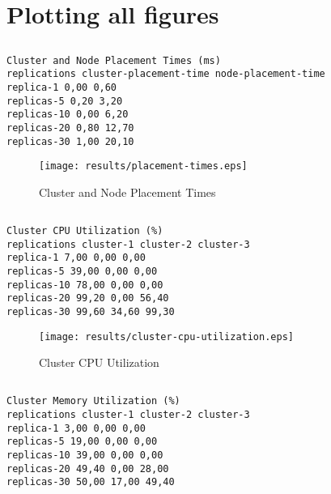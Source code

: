 \documentclass{elsart}
\begin{document}
\section{Plotting all figures}
\subsection{}

\begin{lstlisting}[caption={Cluster and Node Placement Times}]
Cluster and Node Placement Times (ms)
replications cluster-placement-time node-placement-time
replica-1 0,00 0,60
replicas-5 0,20 3,20
replicas-10 0,00 6,20
replicas-20 0,80 12,70
replicas-30 1,00 20,10
\end{lstlisting}

\begin{figure}[ht]
\centering
\texttt{[image: results/placement-times.eps]}
\caption{Cluster and Node Placement Times}\label{fig:placement-times.eps}
\end{figure}

\subsection{}

\begin{lstlisting}[caption={Cluster CPU Utilization}]
Cluster CPU Utilization (%)
replications cluster-1 cluster-2 cluster-3
replica-1 7,00 0,00 0,00
replicas-5 39,00 0,00 0,00
replicas-10 78,00 0,00 0,00
replicas-20 99,20 0,00 56,40
replicas-30 99,60 34,60 99,30
\end{lstlisting}

\begin{figure}[ht]
\centering
\texttt{[image: results/cluster-cpu-utilization.eps]}
\caption{Cluster CPU Utilization}\label{fig:cluster-cpu-utilization.eps}
\end{figure}

\subsection{}

\begin{lstlisting}[caption={Cluster Memory Utilization}]
Cluster Memory Utilization (%)
replications cluster-1 cluster-2 cluster-3
replica-1 3,00 0,00 0,00
replicas-5 19,00 0,00 0,00
replicas-10 39,00 0,00 0,00
replicas-20 49,40 0,00 28,00
replicas-30 50,00 17,00 49,40
\end{lstlisting}
\end{document}
